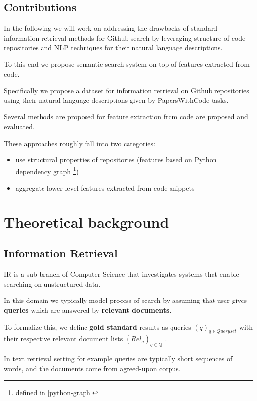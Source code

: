 \documentclass[longabstract,mgr,english]{iithesis}
\begin{document}
\section{Contributions}

In the following we will work on addressing the drawbacks of standard
information retrieval methods for Github search by leveraging structure of code repositories and NLP techniques for their natural language descriptions.

To this end we propose semantic search system on top of features extracted from code.

Specifically we propose a dataset for information retrieval on Github repositories using their natural language descriptions given by PapersWithCode tasks.

Several methods are proposed for feature extraction from code are proposed and evaluated.

These approaches roughly fall into two categories:
\begin{itemize}
\item use structural properties of repositories (features based on Python dependency graph \footnote{defined in \ref{python-graph}})
\item aggregate lower-level features extracted from code snippets
\end{itemize}


\chapter{Theoretical background}


\section{Information Retrieval}


IR is a sub-branch of Computer Science that investigates systems that enable searching on unstructured data.

In this domain we typically model process of search by assuming that user gives \textbf{\textbf{queries}} which are answered by \textbf{\textbf{relevant documents}}.

To formalize this, we define \textbf{gold standard} results as queries \((q)_{q \in Queryset}\) with their respective relevant document lists \((Rel_q)_{q \in Q}\) .

In text retrieval setting for example queries are typically short sequences of words, and the documents come from agreed-upon corpus.
\end{document}
